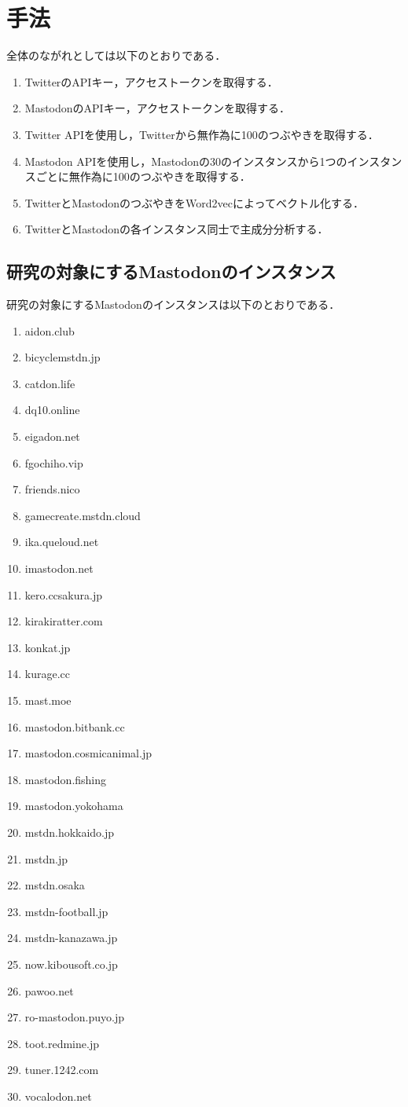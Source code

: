 \chapter{手法}
全体のながれとしては以下のとおりである．

\begin{enumerate}
\item TwitterのAPIキー，アクセストークンを取得する．
\item MastodonのAPIキー，アクセストークンを取得する．
\item Twitter APIを使用し，Twitterから無作為に100のつぶやきを取得する．
\item Mastodon APIを使用し，Mastodonの30のインスタンスから1つのインスタンスごとに無作為に100のつぶやきを取得する．
\item TwitterとMastodonのつぶやきをWord2vecによってベクトル化する．
\item TwitterとMastodonの各インスタンス同士で主成分分析する．
\end{enumerate}
\newpage

\section{研究の対象にするMastodonのインスタンス}

研究の対象にするMastodonのインスタンスは以下のとおりである．

\begin{enumerate}
\item aidon.club
\item bicyclemstdn.jp
\item catdon.life
\item dq10.online
\item eigadon.net
\item fgochiho.vip
\item friends.nico
\item gamecreate.mstdn.cloud
\item ika.queloud.net
\item imastodon.net
\item kero.ccsakura.jp
\item kirakiratter.com
\item konkat.jp
\item kurage.cc
\item mast.moe
\item mastodon.bitbank.cc
\item mastodon.cosmicanimal.jp
\item mastodon.fishing
\item mastodon.yokohama
\item mstdn.hokkaido.jp
\item mstdn.jp
\item mstdn.osaka
\item mstdn-football.jp
\item mstdn-kanazawa.jp
\item now.kibousoft.co.jp
\item pawoo.net
\item ro-mastodon.puyo.jp
\item toot.redmine.jp
\item tuner.1242.com
\item vocalodon.net
\end{enumerate}
\newpage

